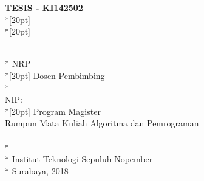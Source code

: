\newpage

  \sffamily
  \thispagestyle{empty}
  \begin{spacing}{2.0}
  {\noindent
    \textbf{TESIS - KI142502}\\*[20pt]
    {\large\textbf{\MakeUppercase{\judul}}} \\*[20pt]
  }
  \end{spacing}
  \begin{spacing}{1.3}
  {\large \noindent
    \MakeUppercase{\penulis} \\*
    NRP \nrplama \\*[20pt]
    Dosen Pembimbing\\*
    \pembimbingsatu \\
    NIP: \nikpembimbingsatu \\*[20pt]
    Program Magister\\
    Rumpun Mata Kuliah Algoritma dan Pemrograman\\
    \MakeUppercase{\jurusanbaru} \\*
    \fakultasbaru \\*
    Institut Teknologi Sepuluh Nopember \\*
    Surabaya, 2018
  }
  \end{spacing}
  \rmfamily
  \normalsize
  \restoregeometry
  \cleardoublepage
